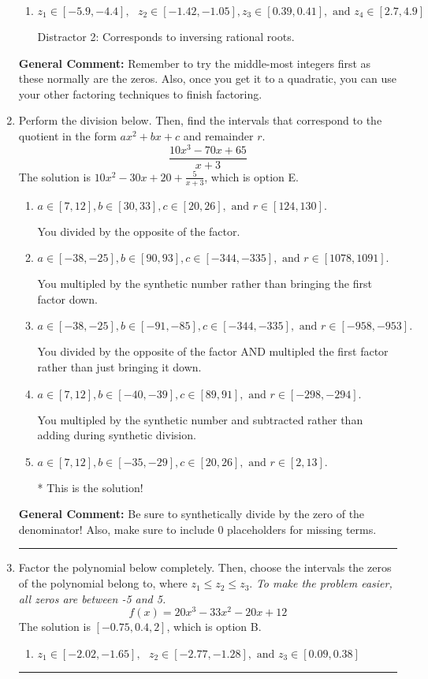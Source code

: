 \documentclass{extbook}[14pt]
\newcommand{\litem}[1]{\item #1

\rule{\textwidth}{0.4pt}}
\begin{document}
\begin{enumerate}
{\begin{enumerate}[label=\Alph*.]
 Distractor 1: Corresponds to negatives of all zeros.
\item \( z_1 \in [-5.9, -4.4], \text{   }  z_2 \in [-1.42, -1.05], z_3 \in [0.39, 0.41], \text{   and   } z_4 \in [2.7, 4.9] \)

 Distractor 2: Corresponds to inversing rational roots.
\end{enumerate}

\textbf{General Comment:} Remember to try the middle-most integers first as these normally are the zeros. Also, once you get it to a quadratic, you can use your other factoring techniques to finish factoring.
}
\litem{
Perform the division below. Then, find the intervals that correspond to the quotient in the form $ax^2+bx+c$ and remainder $r$.
\[ \frac{10x^{3} -70 x + 65}{x + 3} \]The solution is \( 10x^{2} -30 x + 20 + \frac{5}{x + 3} \), which is option E.\begin{enumerate}[label=\Alph*.]
\item \( a \in [7, 12], b \in [30, 33], c \in [20, 26], \text{ and } r \in [124, 130]. \)

 You divided by the opposite of the factor.
\item \( a \in [-38, -25], b \in [90, 93], c \in [-344, -335], \text{ and } r \in [1078, 1091]. \)

 You multipled by the synthetic number rather than bringing the first factor down.
\item \( a \in [-38, -25], b \in [-91, -85], c \in [-344, -335], \text{ and } r \in [-958, -953]. \)

 You divided by the opposite of the factor AND multipled the first factor rather than just bringing it down.
\item \( a \in [7, 12], b \in [-40, -39], c \in [89, 91], \text{ and } r \in [-298, -294]. \)

 You multipled by the synthetic number and subtracted rather than adding during synthetic division.
\item \( a \in [7, 12], b \in [-35, -29], c \in [20, 26], \text{ and } r \in [2, 13]. \)

* This is the solution!
\end{enumerate}

\textbf{General Comment:} Be sure to synthetically divide by the zero of the denominator! Also, make sure to include 0 placeholders for missing terms.
}
\litem{
Factor the polynomial below completely. Then, choose the intervals the zeros of the polynomial belong to, where $z_1 \leq z_2 \leq z_3$. \textit{To make the problem easier, all zeros are between -5 and 5.}
\[ f(x) = 20x^{3} -33 x^{2} -20 x + 12 \]The solution is \( [-0.75, 0.4, 2] \), which is option B.\begin{enumerate}[label=\Alph*.]
\item \( z_1 \in [-2.02, -1.65], \text{   }  z_2 \in [-2.77, -1.28], \text{   and   } z_3 \in [0.09, 0.38] \)


\end{enumerate}}
\end{enumerate}
\end{document}

